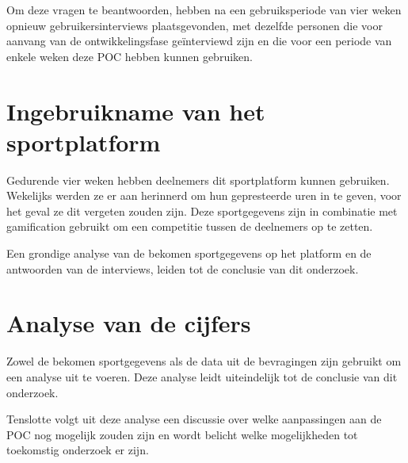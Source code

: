 Om deze vragen te beantwoorden, hebben na een gebruiksperiode van vier weken opnieuw gebruikersinterviews plaatsgevonden, met dezelfde personen die voor aanvang van de ontwikkelingsfase geïnterviewd zijn en die voor een periode van enkele weken deze POC hebben kunnen gebruiken.

\section{Ingebruikname van het sportplatform}

Gedurende vier weken hebben deelnemers dit sportplatform kunnen gebruiken. Wekelijks werden ze er aan herinnerd om hun gepresteerde uren in te geven, voor het geval ze dit vergeten zouden zijn. Deze sportgegevens zijn in combinatie met gamification gebruikt om een competitie tussen de deelnemers op te zetten.

Een grondige analyse van de bekomen sportgegevens op het platform en de antwoorden van de interviews, leiden tot de conclusie van dit onderzoek.

\section{Analyse van de cijfers}

Zowel de bekomen sportgegevens als de data uit de bevragingen zijn gebruikt om een analyse uit te voeren. Deze analyse leidt uiteindelijk tot de conclusie van dit onderzoek.

Tenslotte volgt uit deze analyse een discussie over welke aanpassingen aan de POC nog mogelijk zouden zijn en wordt belicht welke mogelijkheden tot toekomstig onderzoek er zijn.




